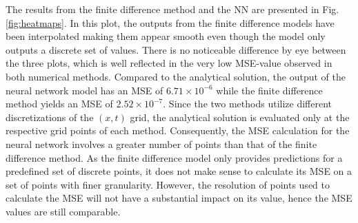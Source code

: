 The results from the finite difference method and the NN are presented in Fig. \ref{fig:heatmaps}.
In this plot, the outputs from the finite difference models have been interpolated making them appear smooth even though the model only outputs a discrete set of values. 
There is no noticeable difference by eye between the three plots, which is well reflected in the very low MSE-value observed in both numerical methods. 
Compared to the analytical solution, the output of the neural network model has an MSE of $ 6.71 \times 10^{-6}$ while the finite difference method yields an MSE of $2.52 \times 10^{-7}$. 
Since the two methods utilize different discretizations of the $(x,t)$ grid, the analytical solution is evaluated only at the respective grid points of each method. 
Consequently, the MSE calculation for the neural network involves a greater number of points than that of the finite difference method.
As the finite difference model only provides predictions for a predefined set of discrete points, it does not make sense to calculate its MSE on a set of points with finer granularity.
However, the resolution of points used to calculate the MSE will not have a substantial impact on its value, hence the MSE values are still comparable.
